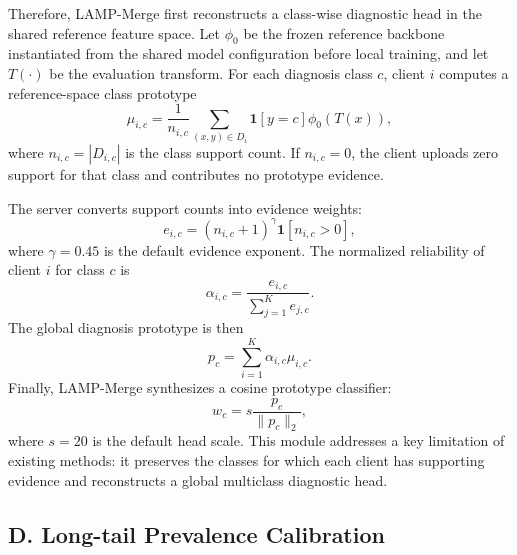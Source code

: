 \documentclass[letterpaper]{article} %
\begin{document}
Therefore, LAMP-Merge first reconstructs a class-wise diagnostic head in the shared reference feature space. Let $\phi_0$ be the frozen reference backbone instantiated from the shared model configuration before local training, and let $T(\cdot)$ be the evaluation transform. For each diagnosis class $c$, client $i$ computes a reference-space class prototype
\begin{equation}
\mu_{i,c}=\frac{1}{n_{i,c}}\sum_{(x,y)\in D_i}\mathbf{1}[y=c]\phi_0(T(x)),
\end{equation}
where $n_{i,c}=|D_{i,c}|$ is the class support count. If $n_{i,c}=0$, the client uploads zero support for that class and contributes no prototype evidence.

The server converts support counts into evidence weights:
\begin{equation}
e_{i,c}=(n_{i,c}+1)^\gamma \mathbf{1}[n_{i,c}>0],
\end{equation}
where $\gamma=0.45$ is the default evidence exponent. The normalized reliability of client $i$ for class $c$ is
\begin{equation}
\alpha_{i,c}=\frac{e_{i,c}}{\sum_{j=1}^{K} e_{j,c}}.
\end{equation}
The global diagnosis prototype is then
\begin{equation}
p_c=\sum_{i=1}^{K}\alpha_{i,c}\mu_{i,c}.
\end{equation}
Finally, LAMP-Merge synthesizes a cosine prototype classifier:
\begin{equation}
w_c=s\frac{p_c}{\|p_c\|_2},
\end{equation}
where $s=20$ is the default head scale. This module addresses a key limitation of existing methods: it preserves the classes for which each client has supporting evidence and reconstructs a global multiclass diagnostic head.

\subsection{D. Long-tail Prevalence Calibration}
\end{document}
